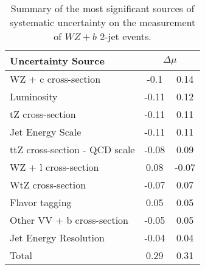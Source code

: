 \begin{table}[H]
    \centering
    \begin{tabular}{l|cc}
        \hline\hline
        Uncertainty Source & \multicolumn{2}{c}{$\Delta \mu$ }  \\
        \hline
        WZ + c cross-section & -0.1 & 0.14 \\
        Luminosity & -0.11 & 0.12 \\
        tZ cross-section & -0.11 & 0.11 \\
        Jet Energy Scale & -0.11 & 0.11 \\
        ttZ cross-section - QCD scale & -0.08 & 0.09 \\
        WZ + l cross-section & 0.08 & -0.07 \\
        WtZ cross-section & -0.07 & 0.07 \\
        Flavor tagging  & 0.05 & 0.05 \\
        Other VV + b cross-section & -0.05 & 0.05 \\
        Jet Energy Resolution & -0.04 & 0.04 \\
        \hline
        Total & 0.29 & 0.31 \\

        \hline\hline
    \end{tabular}
    \caption{Summary of the most significant sources of systematic uncertainty on the measurement of $WZ+b$ 2-jet events.}
    \label{tab:systematics_2j}
\end{table}

